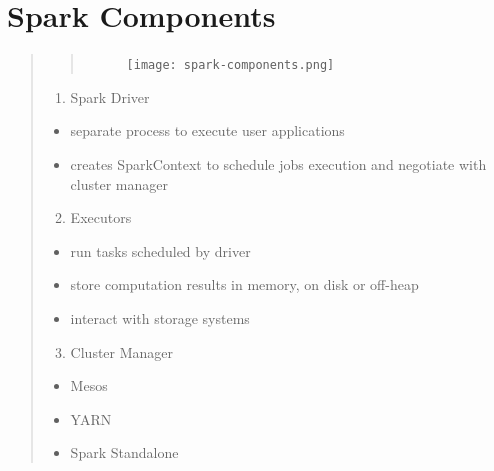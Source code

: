 \documentclass[letterpaper,11pt,english]{sphinxmanual}
\begin{document}
\section{Spark Components}
\label{introduction:spark-components}\begin{quote}
\begin{quote}
\begin{figure}[htbp]
\centering

\texttt{[image: spark-components.png]}
\label{introduction:fig-spark-components}\end{figure}
\end{quote}
\begin{enumerate}
\item {} 
Spark Driver

\end{enumerate}
\begin{itemize}
\item {} 
separate process to execute user applications

\item {} 
creates SparkContext to schedule jobs execution
and negotiate with cluster manager

\end{itemize}
\begin{enumerate}
\setcounter{enumi}{1}
\item {} 
Executors

\end{enumerate}
\begin{itemize}
\item {} 
run tasks scheduled by driver

\item {} 
store computation results in memory, on disk or off-heap

\item {} 
interact with storage systems

\end{itemize}
\begin{enumerate}
\setcounter{enumi}{2}
\item {} 
Cluster Manager

\end{enumerate}
\begin{itemize}
\item {} 
Mesos

\item {} 
YARN

\item {} 
Spark Standalone

\end{itemize}
\end{quote}
\end{document}

